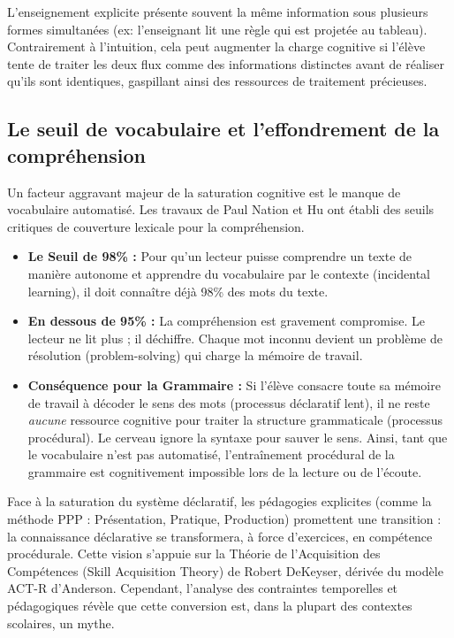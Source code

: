 L'enseignement explicite présente souvent la même information sous plusieurs formes simultanées (ex:
l'enseignant lit une règle qui est projetée au tableau). Contrairement à l'intuition, cela peut
augmenter la charge cognitive si l'élève tente de traiter les deux flux comme des informations
distinctes avant de réaliser qu'ils sont identiques, gaspillant ainsi des ressources de traitement
précieuses.\cite{II-2-2-ref32}



\subsection{Le seuil de vocabulaire et l'effondrement de la compréhension}

Un facteur aggravant majeur de la saturation cognitive est le manque de vocabulaire automatisé. Les
travaux de Paul Nation et Hu ont établi des seuils critiques de couverture lexicale pour la
compréhension.

\begin{itemize}\item \textbf{Le Seuil de 98\% :} Pour qu'un lecteur puisse comprendre un texte de manière autonome et apprendre du vocabulaire par le contexte (incidental learning), il doit connaître déjà 98\% des mots du texte.\cite{II-2-2-ref33}\item \textbf{En dessous de 95\% :} La compréhension est gravement compromise. Le lecteur ne \og lit\fg{} plus ; il \og déchiffre\fg{}. Chaque mot inconnu devient un problème de résolution (problem-solving) qui charge la mémoire de travail.\item \textbf{Conséquence pour la Grammaire :} Si l'élève consacre toute sa mémoire de travail à décoder le sens des mots (processus déclaratif lent), il ne reste \textit{aucune} ressource cognitive pour traiter la structure grammaticale (processus procédural). Le cerveau ignore la syntaxe pour sauver le sens. Ainsi, tant que le vocabulaire n'est pas automatisé, l'entraînement procédural de la grammaire est cognitivement impossible lors de la lecture ou de l'écoute.\cite{II-2-2-ref36}\end{itemize}Face à la saturation du système déclaratif, les pédagogies explicites (comme la méthode PPP :
Présentation, Pratique, Production) promettent une transition : la connaissance déclarative se
transformera, à force d'exercices, en compétence procédurale. Cette vision s'appuie sur la Théorie
de l'Acquisition des Compétences (Skill Acquisition Theory) de Robert DeKeyser, dérivée du modèle
ACT-R d'Anderson.\cite{II-2-2-ref7} Cependant, l'analyse des contraintes temporelles et pédagogiques
révèle que cette conversion est, dans la plupart des contextes scolaires, un mythe.



